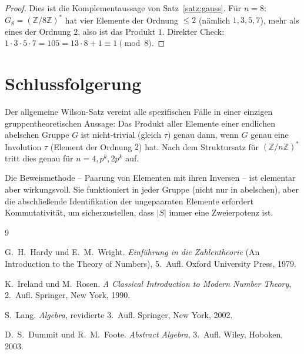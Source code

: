 \documentclass[12pt,a4paper]{amsart}
\theoremstyle{definition}
\newcommand{\Z}{\mathbb{Z}}
\begin{document}
\begin{proof}
  Dies ist die Komplementaussage von Satz~\ref{satz:gauss}. Für $n = 8$:
  $G_8 = (\Z/8\Z)^*$ hat vier Elemente der Ordnung $\leq 2$ (nämlich $1,3,5,7$),
  mehr als eines der Ordnung $2$, also ist das Produkt $1$.
  Direkter Check: $1 \cdot 3 \cdot 5 \cdot 7 = 105 = 13 \cdot 8 + 1 \equiv 1 \pmod{8}$. \checkmark
\end{proof}

\section{Schlussfolgerung}

Der allgemeine Wilson-Satz vereint alle spezifischen Fälle in einer einzigen
gruppentheoretischen Aussage: Das Produkt aller Elemente einer endlichen
abelschen Gruppe $G$ ist nicht-trivial (gleich $\tau$) genau dann, wenn $G$
genau eine Involution $\tau$ (Element der Ordnung $2$) hat. Nach dem
Struktursatz für $(\Z/n\Z)^*$ tritt dies genau für $n = 4, p^k, 2p^k$ auf.

Die Beweismethode – Paarung von Elementen mit ihren Inversen – ist elementar
aber wirkungsvoll. Sie funktioniert in jeder Gruppe (nicht nur in abelschen),
aber die abschließende Identifikation der ungepaaraten Elemente erfordert
Kommutativität, um sicherzustellen, dass $|S|$ immer eine Zweierpotenz ist.

\begin{thebibliography}{9}

G.~H.~Hardy und E.~M.~Wright.
\newblock \emph{Einführung in die Zahlentheorie} (An Introduction to the Theory of Numbers), 5.~Aufl.
\newblock Oxford University Press, 1979.

K.~Ireland und M.~Rosen.
\newblock \emph{A Classical Introduction to Modern Number Theory}, 2.~Aufl.
\newblock Springer, New York, 1990.

S.~Lang.
\newblock \emph{Algebra}, revidierte 3.~Aufl.
\newblock Springer, New York, 2002.

D.~S.~Dummit und R.~M.~Foote.
\newblock \emph{Abstract Algebra}, 3.~Aufl.
\newblock Wiley, Hoboken, 2003.

\end{thebibliography}
\end{document}
